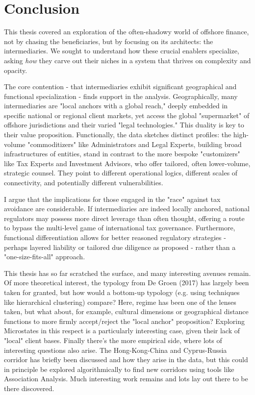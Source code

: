 \chapter{Conclusion}
\label{chap:conclusion}

This thesis covered an exploration of the often-shadowy world of offshore finance, not by chasing the beneficiaries, but by focusing on its architects: the intermediaries. We sought to understand how these crucial enablers specialize, asking \textit{how} they carve out their niches in a system that thrives on complexity and opacity. 

The core contention - that intermediaries exhibit significant geographical and functional specialization - finds support in the analysis. Geographically, many intermediaries are "local anchors with a global reach," deeply embedded in specific national or regional client markets, yet access the global "supermarket" of offshore jurisdictions and their varied "legal technologies." This duality is key to their value proposition. Functionally, the data sketches distinct profiles: the high-volume "commoditizers" like Administrators and Legal Experts, building broad infrastructures of entities, stand in contrast to the more bespoke "customizers" like Tax Experts and Investment Advisors, who offer tailored, often lower-volume, strategic counsel. They point to different operational logics, different scales of connectivity, and potentially different vulnerabilities.

I argue that the implications for those engaged in the "race" against tax avoidance are considerable. If intermediaries are indeed locally anchored, national regulators may possess more direct leverage than often thought, offering a route to bypass the multi-level game of international tax governance. Furthermore, functional differentiation allows for better reasoned regulatory strategies - perhaps layered liability or tailored due diligence as proposed - rather than a "one-size-fits-all" approach.

This thesis has so far scratched the surface, and many interesting avenues remain. Of more theoretical interest, the typology from De Groen (2017) has largely been taken for granted, but how would a bottom-up typology (e.g. using techniques like hierarchical clustering) compare? Here, regime has been one of the lenses taken, but what about, for example, cultural dimensions or geographical distance functions to more firmly accept/reject the "local anchor" proposition? Exploring Microstates in this respect is a particularly interesting case, given their lack of "local" client bases. Finally there's the more empirical side, where lots of interesting questions also arise. The Hong-Kong-China and Cyprus-Russia corridor has briefly been discussed and how they arise in the data, but this could in principle be explored algorithmically to find new corridors using tools like Association Analysis. Much interesting work remains and lots lay out there to be there discovered.

